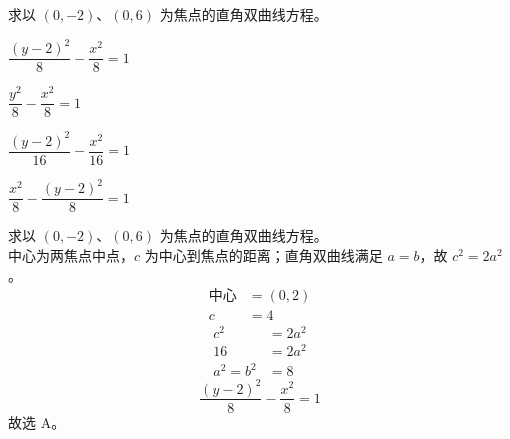 \documentclass[12pt,a4paper]{exam-zh}
\begin{document}
\begin{question}
    求以 $(0,-2)$、$(0,6)$ 为焦点的直角双曲线方程。 \paren[2]
    \begin{choices}
        \item $\dfrac{(y-2)^2}{8}-\dfrac{x^2}{8}=1$
        \item $\dfrac{y^2}{8}-\dfrac{x^2}{8}=1$
        \item $\dfrac{(y-2)^2}{16}-\dfrac{x^2}{16}=1$
        \item $\dfrac{x^2}{8}-\dfrac{(y-2)^2}{8}=1$
    \end{choices}
\end{question}

\begin{solution}
    求以 $(0,-2)$、$(0,6)$ 为焦点的直角双曲线方程。 \\
    中心为两焦点中点，$c$ 为中心到焦点的距离；直角双曲线满足 $a=b$，故 $c^2=2a^2$。 \\
    \begin{align*}
        \text{中心} &= (0,2) \\
        c &= 4
    \end{align*}
    \begin{align*}
        c^2 &= 2a^2 \\
        16 &= 2a^2 \\
        a^2=b^2 &= 8
    \end{align*}
    \[
        \frac{(y-2)^2}{8}-\frac{x^2}{8}=1
    \]
    故选 A。
\end{solution}
\end{document}
